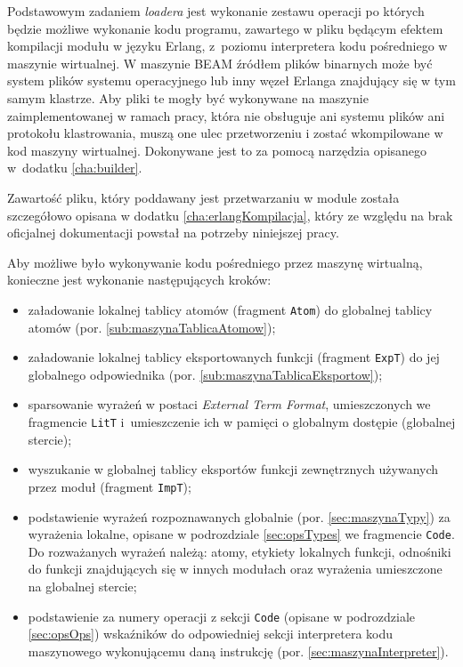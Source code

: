 Podstawowym zadaniem \emph{loadera} jest wykonanie zestawu operacji po których będzie możliwe wykonanie kodu programu, zawartego w pliku będącym efektem kompilacji modułu w języku Erlang, z~poziomu interpretera kodu pośredniego w maszynie wirtualnej.
W maszynie BEAM źródłem plików binarnych może być system plików systemu operacyjnego lub inny węzeł Erlanga znajdujący się w tym samym klastrze. Aby pliki te mogły być wykonywane na maszynie zaimplementowanej w ramach pracy, która nie obsługuje ani systemu plików ani protokołu klastrowania, muszą one ulec przetworzeniu i zostać wkompilowane w kod maszyny wirtualnej. Dokonywane jest to za pomocą narzędzia opisanego w~dodatku \ref{cha:builder}.

Zawartość pliku, który poddawany jest przetwarzaniu w module została szczegółowo opisana w dodatku \ref{cha:erlangKompilacja}, który ze względu na brak oficjalnej dokumentacji powstał na potrzeby niniejszej pracy.

Aby możliwe było wykonywanie kodu pośredniego przez maszynę wirtualną, konieczne jest wykonanie następujących kroków:
\begin{itemize}
\item załadowanie lokalnej tablicy atomów (fragment \texttt{Atom}) do globalnej tablicy atomów (por. \ref{sub:maszynaTablicaAtomow});
\item załadowanie lokalnej tablicy eksportowanych funkcji (fragment \texttt{ExpT}) do jej globalnego odpowiednika (por. \ref{sub:maszynaTablicaEksportow});
\item sparsowanie wyrażeń w postaci \emph{External Term Format}, umieszczonych we fragmencie \texttt{LitT} i~umieszczenie ich w pamięci o globalnym dostępie (globalnej stercie);
\item wyszukanie w globalnej tablicy eksportów funkcji zewnętrznych używanych przez moduł (fragment \texttt{ImpT});
\item podstawienie wyrażeń rozpoznawanych globalnie (por. \ref{sec:maszynaTypy}) za wyrażenia lokalne, opisane w podrozdziale \ref{sec:opsTypes} we fragmencie \texttt{Code}. Do rozważanych wyrażeń należą: atomy, etykiety lokalnych funkcji, odnośniki do funkcji znajdujących się w innych modułach oraz wyrażenia umieszczone na globalnej stercie;
\item podstawienie za numery operacji z sekcji \texttt{Code} (opisane w podrozdziale \ref{sec:opsOps}) wskaźników do odpowiedniej sekcji interpretera kodu maszynowego wykonującemu daną instrukcję (por. \ref{sec:maszynaInterpreter}).
\end{itemize}

